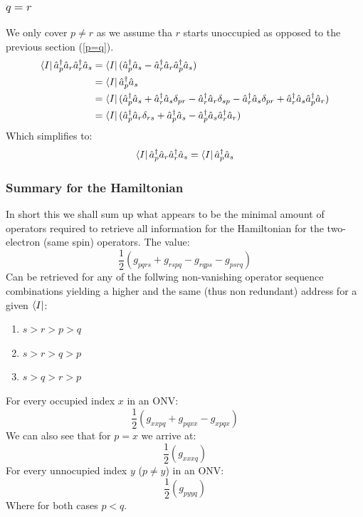 \documentclass[12p]{article}
\begin{document}
\subsubsection{$q=r$}
We only cover $p \neq r$ as we assume tha $r$ starts unoccupied as opposed to the previous section (\ref{p=q}).
\begin{align}
  \bra{I} \hat{a}^\dagger_p \hat{a}_r \hat{a}^\dagger_r \hat{a}_s & =   \bra{I} (\hat{a}^\dagger_p \hat{a}_s - \hat{a}^\dagger_r \hat{a}_r \hat{a}^\dagger_p \hat{a}_s) \nonumber \\
  & =   \bra{I} \hat{a}^\dagger_p \hat{a}_s  \\
  & =   \bra{I} (\hat{a}^\dagger_p \hat{a}_s + \hat{a}^\dagger_r \hat{a}_s \delta_{pr} - \hat{a}^\dagger_r \hat{a}_r  \delta_{sp} - \hat{a}^\dagger_r \hat{a}_s \delta_{pr} + \hat{a}^\dagger_r \hat{a}_s \hat{a}^\dagger_p \hat{a}_r) \\
  & =   \bra{I} (\hat{a}^\dagger_p \hat{a}_r \delta_{rs} + \hat{a}^\dagger_p \hat{a}_s - \hat{a}^\dagger_p \hat{a}_s \hat{a}^\dagger_r \hat{a}_r)
\end{align}
Which simplifies to:
\begin{equation}
    \bra{I} \hat{a}^\dagger_p \hat{a}_r \hat{a}^\dagger_r \hat{a}_s =   \bra{I} \hat{a}^\dagger_p \hat{a}_s
\end{equation}


\subsubsection{Summary for the Hamiltonian}
In short this we shall sum up what appears to be the minimal amount of operators required to retrieve all information for the Hamiltonian for the two-electron (same spin) operators.
The value:
\begin{equation}
  \frac{1}{2} (g_{pqrs} + g_{rspq} - g_{rqps} - g_{psrq})
\end{equation}
 Can be retrieved for any of the follwing non-vanishing operator sequence combinations yielding a higher and the same (thus non redundant) address for a given $\bra{I}$:
\begin{enumerate}
  \item $s > r > p > q$
  \item $s > r > q > p$
  \item $s > q > r > p$
\end{enumerate}
For every occupied index $x$ in an ONV:
\begin{equation}
  \frac{1}{2} (g_{xxpq} + g_{pqxx} - g_{xpqx})
\end{equation}
We can also see that for $p=x$ we arrive at:
\begin{equation}
  \frac{1}{2} (g_{xxxq})
\end{equation}
For every unnocupied index $y$ ($p \neq y$) in an ONV:
\begin{equation}
  \frac{1}{2} (g_{pyyq})
\end{equation}
Where for both cases $p<q$.
\end{document}
